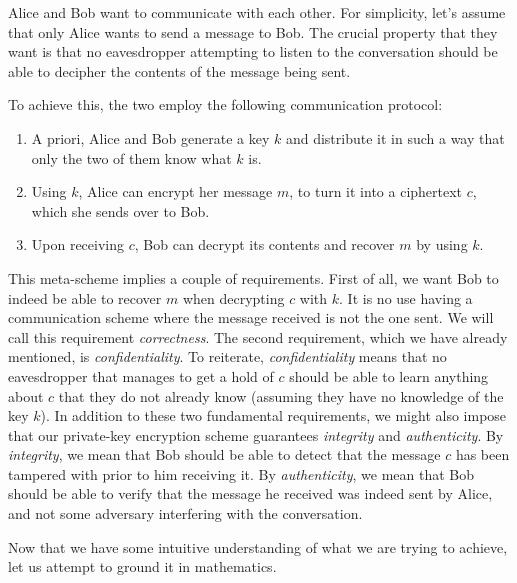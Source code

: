 \documentclass[12pt]{tufte-book}
\begin{document}
Alice and Bob want to communicate with each other.
For simplicity, let's assume that only Alice wants to send a message to Bob.
The crucial property that they want is that no eavesdropper attempting to listen to the conversation should be able to decipher the contents of the message being sent.

To achieve this, the two employ the following communication protocol:
\begin{enumerate}
    \item A priori, Alice and Bob generate a key $k$ and distribute it in such a way that only the two of them know what $k$ is.
    \item Using $k$, Alice can encrypt her message $m$, to turn it into a ciphertext $c$, which she sends over to Bob. 
    \item Upon receiving $c$, Bob can decrypt its contents and recover $m$ by using $k$.
\end{enumerate}
This meta-scheme implies a couple of requirements.
First of all, we want Bob to indeed be able to recover $m$ when decrypting $c$ with $k$.
It is no use having a communication scheme where the message received is not the one sent. We will call this requirement \textit{correctness}.
The second requirement, which we have already mentioned, is \textit{confidentiality}.
To reiterate, \textit{confidentiality} means that no eavesdropper that manages to get a hold of $c$ should be able to learn anything about $c$ that they do not already know (assuming they have no knowledge of the key $k$).
In addition to these two fundamental requirements, we might also impose that our private-key encryption scheme guarantees \textit{integrity} and \textit{authenticity}.
By \textit{integrity}, we mean that Bob should be able to detect that the message $c$ has been tampered with prior to him receiving it.
By \textit{authenticity}, we mean that Bob should be able to verify that the message he received was indeed sent by Alice, and not some adversary interfering with the conversation.

Now that we have some intuitive understanding of what we are trying to achieve, let us attempt to ground it in mathematics.
\end{document}
